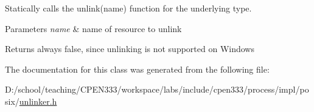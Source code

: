 Statically calls the {\ttfamily unlink(name)} function for the underlying type. 


\begin{DoxyParams}{Parameters}
{\em name} & name of resource to unlink \\
\hline
\end{DoxyParams}
\begin{DoxyReturn}{Returns}
always {\ttfamily false}, since unlinking is not supported on Windows 
\end{DoxyReturn}


The documentation for this class was generated from the following file\+:\begin{DoxyCompactItemize}
\item 
D\+:/school/teaching/\+C\+P\+E\+N333/workspace/labs/include/cpen333/process/impl/posix/\hyperlink{impl_2posix_2unlinker_8h}{unlinker.\+h}\end{DoxyCompactItemize}
